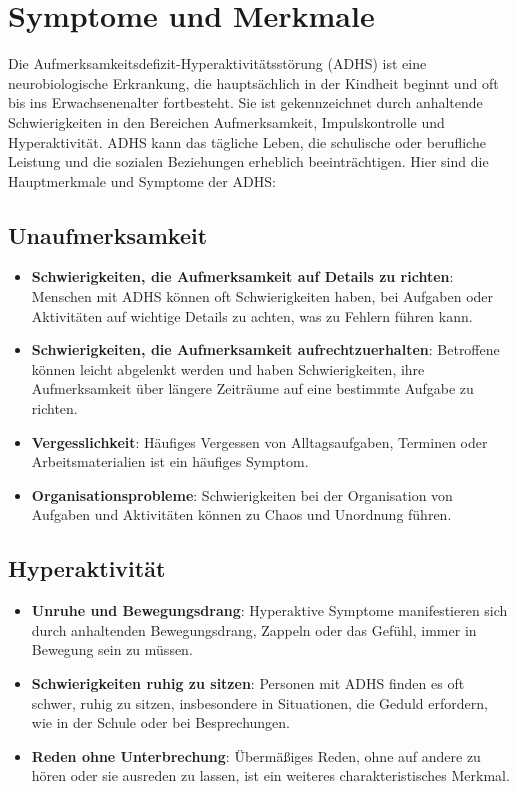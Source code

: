 \section{Symptome und Merkmale}

Die Aufmerksamkeitsdefizit-Hyperaktivitätsstörung (ADHS) ist eine neurobiologische Erkrankung, die hauptsächlich in der Kindheit beginnt und oft bis ins Erwachsenenalter fortbesteht. Sie ist gekennzeichnet durch anhaltende Schwierigkeiten in den Bereichen Aufmerksamkeit, Impulskontrolle und Hyperaktivität. ADHS kann das tägliche Leben, die schulische oder berufliche Leistung und die sozialen Beziehungen erheblich beeinträchtigen. Hier sind die Hauptmerkmale und Symptome der ADHS:

\subsection{Unaufmerksamkeit}

\begin{itemize}
\item \textbf{Schwierigkeiten, die Aufmerksamkeit auf Details zu richten}: Menschen mit ADHS können oft Schwierigkeiten haben, bei Aufgaben oder Aktivitäten auf wichtige Details zu achten, was zu Fehlern führen kann.

\item \textbf{Schwierigkeiten, die Aufmerksamkeit aufrechtzuerhalten}: Betroffene können leicht abgelenkt werden und haben Schwierigkeiten, ihre Aufmerksamkeit über längere Zeiträume auf eine bestimmte Aufgabe zu richten.

\item \textbf{Vergesslichkeit}: Häufiges Vergessen von Alltagsaufgaben, Terminen oder Arbeitsmaterialien ist ein häufiges Symptom.

\item \textbf{Organisationsprobleme}: Schwierigkeiten bei der Organisation von Aufgaben und Aktivitäten können zu Chaos und Unordnung führen.
\end{itemize}

\subsection{Hyperaktivität}

\begin{itemize}
\item \textbf{Unruhe und Bewegungsdrang}: Hyperaktive Symptome manifestieren sich durch anhaltenden Bewegungsdrang, Zappeln oder das Gefühl, immer in Bewegung sein zu müssen.

\item \textbf{Schwierigkeiten ruhig zu sitzen}: Personen mit ADHS finden es oft schwer, ruhig zu sitzen, insbesondere in Situationen, die Geduld erfordern, wie in der Schule oder bei Besprechungen.

\item \textbf{Reden ohne Unterbrechung}: Übermäßiges Reden, ohne auf andere zu hören oder sie ausreden zu lassen, ist ein weiteres charakteristisches Merkmal.
\end{itemize}

